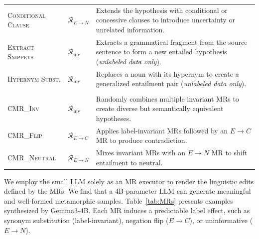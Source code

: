 \documentclass[lettersize,journal]{IEEEtran}
\begin{document}
\begin{table}[h]
\begin{tabularx}{\columnwidth}{>{\raggedright\arraybackslash}p{}
			>{\centering\arraybackslash}p{}
			>{\raggedright\arraybackslash}X}
		\textsc{Conditional Clause} & $\mathcal{R}_{E\rightarrow N}$ & Extends the hypothesis with conditional or concessive clauses to introduce uncertainty or unrelated information. \\
		\textsc{Extract Snippets} & $\mathcal{R}_{\mathrm{inv}}$ & Extracts a grammatical fragment from the source sentence to form a new entailed hypothesis (\textit{unlabeled data only}). \\
		\textsc{Hypernym Subst.} & $\mathcal{R}_{\mathrm{inv}}$ & Replaces a noun with its hypernym to create a generalized entailment pair (\textit{unlabeled data only}). \\
		\midrule
		\multicolumn{3}{c}{\textit{Composite MRs (CMRs)}} \\
		\midrule
		\textsc{CMR\_Inv} & $\mathcal{R}_{\mathrm{inv}}$ & Randomly combines multiple invariant MRs to create diverse but semantically equivalent hypotheses. \\
		\textsc{CMR\_Flip} & $\mathcal{R}_{E\rightarrow C}$ & Applies label-invariant MRs followed by an $E\!\rightarrow\!C$ MR to produce contradiction. \\
		\textsc{CMR\_Neutral} & $\mathcal{R}_{E\rightarrow N}$ & Mixes invariant MRs with an $E\!\rightarrow\!N$ MR to shift entailment to neutral. \\
		\bottomrule
	\end{tabularx}
\end{table}


We employ the small LLM solely as an MR executor to render the linguistic edits defined by the MRs. We find that a 4B-parameter LLM can generate meaningful and well-formed metamorphic samples. Table~\ref{tab:MRs} presents examples synthesized by Gemma3-4B. Each MR induces a predictable label effect, such as synonym substitution (label-invariant), negation flip ($E\rightarrow C$), or uninformative ($E\rightarrow N$). 
\end{document}
